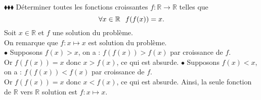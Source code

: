 \documentclass[11pt]{article}
\begin{document}
\begin{exercice}{$\blacklozenge\blacklozenge\blacklozenge$}{}
    Déterminer toutes les fonctions croissantes $f:\mathbb{R}\rightarrow\mathbb{R}$ telles que
    \begin{equation*}
        \forall{x\in\mathbb{R}} \hspace{0.25cm} f(f(x))=x.
    \end{equation*}
    \tcblower
    Soit $x\in\mathbb{R}$ et $f$ une solution du problème.\\
    On remarque que $f:x\mapsto x$ est solution du problème.\\
    $\bullet$ Supposons $f(x)>x$, on a : $f(f(x))>f(x)$ par croissance de $f$.\\
    Or $f(f(x))=x$ donc $x>f(x)$, ce qui est absurde.\n
    $\bullet$ Supposons $f(x)<x$, on a : $f(f(x))<f(x)$ par croissance de $f$.\\
    Or $f(f(x))=x$ donc $x<f(x)$, ce qui est absurde.\n
    Ainsi, la seule fonction de $\mathbb{R}$ vers $\mathbb{R}$ solution est $f:x\mapsto x$.
\end{exercice}
\end{document}
